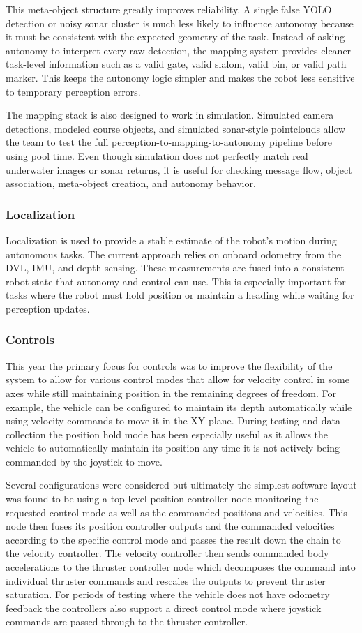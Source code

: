 \documentclass[conference]{IEEEtran}
\begin{document}
This meta-object structure greatly improves reliability. A single false YOLO detection or noisy sonar cluster is much less likely to influence autonomy because it must be consistent with the expected geometry of the task. Instead of asking autonomy to interpret every raw detection, the mapping system provides cleaner task-level information such as a valid gate, valid slalom, valid bin, or valid path marker. This keeps the autonomy logic simpler and makes the robot less sensitive to temporary perception errors.

The mapping stack is also designed to work in simulation. Simulated camera detections, modeled course objects, and simulated sonar-style pointclouds allow the team to test the full perception-to-mapping-to-autonomy pipeline before using pool time. Even though simulation does not perfectly match real underwater images or sonar returns, it is useful for checking message flow, object association, meta-object creation, and autonomy behavior.


\subsubsection{Localization}
Localization is used to provide a stable estimate of the robot's motion during autonomous tasks. The current approach relies on onboard odometry from the DVL, IMU, and depth sensing. These measurements are fused into a consistent robot state that autonomy and control can use. This is especially important for tasks where the robot must hold position or maintain a heading while waiting for perception updates.

\subsubsection{Controls}
This year the primary focus for controls was to improve the flexibility of the system to allow for various control modes that allow for velocity control in some axes while still maintaining position in the remaining degrees of freedom. For example, the vehicle can be configured to maintain its depth automatically while using velocity commands to move it in the XY plane. During testing and data collection the position hold mode has been especially useful as it allows the vehicle to automatically maintain its position any time it is not actively being commanded by the joystick to move.

Several configurations were considered but ultimately the simplest software layout was found to be using a top level position controller node monitoring the requested control mode as well as the commanded positions and velocities. This node then fuses its position controller outputs and the commanded velocities according to the specific control mode and passes the result down the chain to the velocity controller. The velocity controller then sends commanded body accelerations to the thruster controller node which decomposes the command into individual thruster commands and rescales the outputs to prevent thruster saturation. For periods of testing where the vehicle does not have odometry feedback the controllers also support a direct control mode where joystick commands are passed through to the thruster controller.
\end{document}
